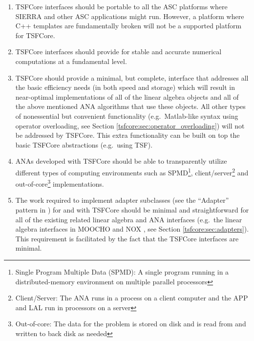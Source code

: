 \begin{enumerate}

\item
TSFCore interfaces should be portable to all the ASC
{}\cite{ref:doe_asci} platforms where SIERRA {}\cite{ref:SIERRA} and
other ASC applications might run.  However, a platform where C++
templates are fundamentally broken will not be a supported platform
for TSFCore.

\item
TSFCore interfaces should provide for stable and accurate numerical
computations at a fundamental level.

\item
TSFCore should provide a minimal, but complete, interface that
addresses all the basic efficiency needs (in both speed and storage)
which will result in near-optimal implementations of all of the linear
algebra objects and all of the above mentioned ANA algorithms that use
these objects.  All other types of nonessential but convenient
functionality (e.g.~Matlab-like syntax using operator overloading, see
Section {}\ref{tsfcore:sec:operator_overloading}) will not be
addressed by TSFCore.  This extra functionality can be built on top
the basic TSFCore abstractions (e.g.~using TSF).

\item
ANAs developed with TSFCore should be able to transparently utilize
different types of computing environments such as SPMD\footnote{Single
Program Multiple Data (SPMD): A single program running in a
distributed-memory environment on multiple parallel processors},
client/server\footnote{Client/Server: The ANA runs in a process on a
client computer and the APP and LAL run in processors on a server} and
out-of-core\footnote{Out-of-core: The data for the problem is stored
on disk and is read from and written to back disk as needed}
implementations.

\item
The work required to implement adapter subclasses (see the ``Adapter''
pattern in {}\cite{ref:gama_et_al_1995}) for and with TSFCore should
be minimal and straightforward for all of the existing related linear
algebra and ANA interfaces (e.g.~the linear algebra interfaces in
MOOCHO {}\cite{ref:moochouserguide} and NOX {}\cite{ref:nox}, see
Section {}\ref{tsfcore:sec:adapters}).  This requirement is
facilitated by the fact that the TSFCore interfaces are minimal.

\end{enumerate}

